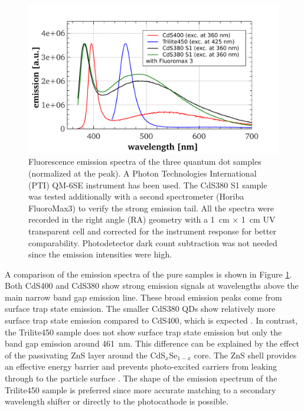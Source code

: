 \documentclass[cits]{JINST}
\begin{document}
\begin{figure}
      \begin{center}
        \includegraphics[scale=0.42]{graphs/publication_emission_comparison_update.pdf}
        \caption[]{Fluorescence emission spectra of the three quantum dot samples (normalized at the peak). A Photon Technologies International (PTI) QM-6SE instrument has been used. The CdS380 S1 sample was tested additionally with a second spectrometer (Horiba FluoroMax3) to verify the strong emission tail. All the spectra were recorded in the right angle (RA) geometry with a 1~cm $\times$ 1~cm UV transparent cell and corrected for the instrument response for better comparability. Photodetector dark count subtraction was not needed since the emission intensities were high. \label{emission_comp}}
        \end{center}
\end{figure}

A comparison of the emission spectra of the pure samples is shown in Figure \ref{emission_comp}. Both CdS400 and CdS380 show strong emission signals at wavelengths above the main narrow band gap emission line. These broad emission peaks come from surface trap state emission. The smaller CdS380 QDs show relatively more surface trap state emission compared to CdS400, which is expected \cite{capek}. In contrast, the Trilite450 sample does not show surface trap state emission but only the band gap emission around 461~nm. This difference can be explained by the effect of the passivating ZnS layer around the CdS$_x$Se$_{1-x}$ core. The ZnS shell provides an effective energy barrier and prevents photo-excited carriers from leaking through to the particle surface \cite{dabbousi1997}. The shape of the emission spectrum of the Trilite450 sample is preferred since more accurate matching to a secondary wavelength shifter or directly to the photocathode is possible.
\end{document}
